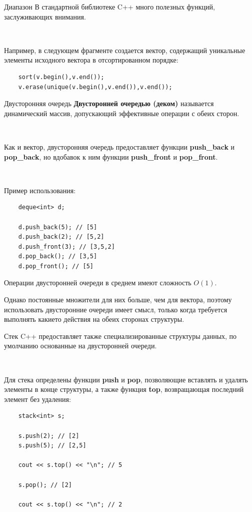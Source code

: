 \documentclass{beamer}
\begin{document}
\begin{frame}[fragile]{Диапазон}
    В стандартной библиотеке C++ много полезных функций, заслуживающих внимания. 
    
    ~
    
    Например, в следующем фрагменте создается вектор, содержащий уникальные элементы исходного вектора в отсортированном порядке:
    
    \begin{verbatim}
    sort(v.begin(),v.end());
    v.erase(unique(v.begin(),v.end()),v.end());
    \end{verbatim}
\end{frame}

\begin{frame}[fragile]{Двусторонняя очередь}
    \textbf{Двусторонней очередью (деком) }называется динамический массив, допускающий эффективные операции с обеих сторон. 
    
    ~
    
    Как и вектор, двусторонняя очередь предоставляет функции \textbf{push\_back} и \textbf{pop\_back}, но вдобавок к ним функции \textbf{push\_front} и \textbf{pop\_front}. 
    
    ~
    
    Пример использования:
    \begin{verbatim}
    deque<int> d;
    
    d.push_back(5); // [5]
    d.push_back(2); // [5,2]
    d.push_front(3); // [3,5,2]
    d.pop_back(); // [3,5]
    d.pop_front(); // [5]
    \end{verbatim}
    
    Операции двусторонней очереди в среднем имеют сложность $O(1)$. 

    Однако постоянные множители для них больше, чем для вектора, поэтому использовать двусторонние очереди имеет смысл, только когда требуется выполнять какие­то действия на обеих сторонах структуры.
\end{frame}

\begin{frame}[fragile]{Стек}
    C++ предоставляет также специализированные структуры данных, по умолчанию основанные на двусторонней очереди. 
    
    ~
    
    Для стека определены функции \textbf{push} и \textbf{pop}, позволяющие вставлять и удалять элементы в конце структуры, а также функция \textbf{top}, возвращающая последний элемент без удаления:
    
    \begin{verbatim}
    stack<int> s;
    
    s.push(2); // [2]
    s.push(5); // [2,5]
    
    cout << s.top() << "\n"; // 5
    
    s.pop(); // [2]
    
    cout << s.top() << "\n"; // 2
    \end{verbatim}
\end{frame}
\end{document}
